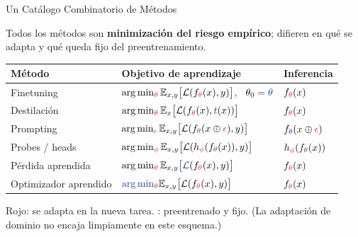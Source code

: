 \documentclass[aspectratio=169, 10pt]{beamer}
\providecommand{\E}{\mathbb{E}}
\newcommand{\ad}[1]{{\color{AdaptRed}#1}}
\newcommand{\fx}[1]{{\color{FixedBlue}#1}}
\begin{document}
\begin{frame}{Un Cat\'alogo Combinatorio de M\'etodos}

	Todos los m\'etodos son \textbf{minimizaci\'on del riesgo emp\'irico}; difieren en \ad{qu\'e se adapta} y \fx{qu\'e queda fijo del preentrenamiento}.

	\vspace{0.3cm}

	\begin{center}
		\renewcommand{\arraystretch}{1.5}
		\begin{tabular}{lll}
			\toprule
			\textbf{M\'etodo} & \textbf{Objetivo de aprendizaje} & \textbf{Inferencia} \\
			\midrule
			Finetuning & $\arg\min_{\ad{\theta}} \E_{x,y}\big[\mathcal{L}(f_{\ad{\theta}}(x), y)\big]$, \ $\theta_0 = \fx{\theta}$ & $f_{\ad{\theta}}(x)$ \\
			Destilaci\'on & $\arg\min_{\ad{\theta}} \E_{x}\big[\mathcal{L}(f_{\ad{\theta}}(x), \fx{t}(x))\big]$ & $f_{\ad{\theta}}(x)$ \\
			Prompting & $\arg\min_{\ad{\epsilon}} \E_{x,y}\big[\mathcal{L}(f_{\fx{\theta}}(x \oplus \ad{\epsilon}), y)\big]$ & $f_{\fx{\theta}}(x \oplus \ad{\epsilon})$ \\
			Probes / heads & $\arg\min_{\ad{\phi}} \E_{x,y}\big[\mathcal{L}(h_{\ad{\phi}}(f_{\fx{\theta}}(x)), y)\big]$ & $h_{\ad{\phi}}(f_{\fx{\theta}}(x))$ \\
			P\'erdida aprendida & $\arg\min_{\ad{\theta}} \E_{x,y}\big[\fx{\mathcal{L}}(f_{\ad{\theta}}(x), y)\big]$ & $f_{\ad{\theta}}(x)$ \\
			Optimizador aprendido & $\fx{\arg\min}_{\ad{\theta}} \E_{x,y}\big[\mathcal{L}(f_{\ad{\theta}}(x), y)\big]$ & $f_{\ad{\theta}}(x)$ \\
			\bottomrule
		\end{tabular}
	\end{center}

	\vspace{0.2cm}

	\small \ad{Rojo}: se adapta en la nueva tarea. \quad \fx{Azul}: preentrenado y fijo. \quad (La adaptaci\'on de dominio no encaja limpiamente en este esquema.)

\end{frame}
\end{document}
